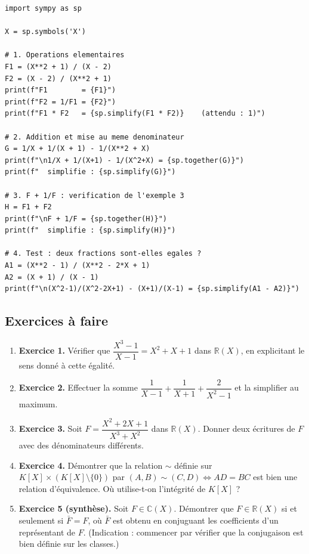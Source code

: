 \begin{lstlisting}
import sympy as sp

X = sp.symbols('X')

# 1. Operations elementaires
F1 = (X**2 + 1) / (X - 2)
F2 = (X - 2) / (X**2 + 1)
print(f"F1        = {F1}")
print(f"F2 = 1/F1 = {F2}")
print(f"F1 * F2   = {sp.simplify(F1 * F2)}    (attendu : 1)")

# 2. Addition et mise au meme denominateur
G = 1/X + 1/(X + 1) - 1/(X**2 + X)
print(f"\n1/X + 1/(X+1) - 1/(X^2+X) = {sp.together(G)}")
print(f"  simplifie : {sp.simplify(G)}")

# 3. F + 1/F : verification de l'exemple 3
H = F1 + F2
print(f"\nF + 1/F = {sp.together(H)}")
print(f"  simplifie : {sp.simplify(H)}")

# 4. Test : deux fractions sont-elles egales ?
A1 = (X**2 - 1) / (X**2 - 2*X + 1)
A2 = (X + 1) / (X - 1)
print(f"\n(X^2-1)/(X^2-2X+1) - (X+1)/(X-1) = {sp.simplify(A1 - A2)}")
\end{lstlisting}

\subsection{Exercices à faire}
\begin{enumerate}
    \item \textbf{Exercice 1.} Vérifier que $\dfrac{X^3 - 1}{X - 1} = X^2 + X + 1$ dans $\mathbb{R}(X)$, en explicitant le sens donné à cette égalité.
    \item \textbf{Exercice 2.} Effectuer la somme $\dfrac{1}{X - 1} + \dfrac{1}{X + 1} + \dfrac{2}{X^2 - 1}$ et la simplifier au maximum.
    \item \textbf{Exercice 3.} Soit $F = \dfrac{X^2 + 2X + 1}{X^3 + X^2}$ dans $\mathbb{R}(X)$. Donner deux écritures de $F$ avec des dénominateurs différents.
    \item \textbf{Exercice 4.} Démontrer que la relation $\sim$ définie sur $K[X] \times (K[X] \setminus \{0\})$ par $(A, B) \sim (C, D) \iff AD = BC$ est bien une relation d'équivalence. Où utilise-t-on l'intégrité de $K[X]$ ?
    \item \textbf{Exercice 5 (synthèse).} Soit $F \in \mathbb{C}(X)$. Démontrer que $F \in \mathbb{R}(X)$ si et seulement si $\bar{F} = F$, où $\bar{F}$ est obtenu en conjuguant les coefficients d'un représentant de $F$. (Indication : commencer par vérifier que la conjugaison est bien définie sur les classes.)
\end{enumerate}

